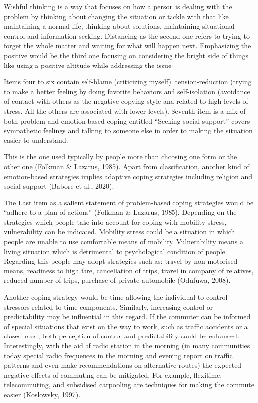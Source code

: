 \documentclass[
11pt, %
oneside, %
english, %
singlespacing, %
]{macthesis} %
\begin{document}
Wishful thinking is a way that focuses on how a person is dealing with the problem by thinking about changing the situation or tackle with that like maintaining a normal life, thinking about solutions, maintaining situational control and information seeking. Distancing as the second one refers to trying to forget the whole matter and waiting for what will happen next. Emphasizing the positive would be the third one focusing on considering the bright side of things like using a positive altitude while addressing the issue.

Items four to six contain self-blame (criticizing myself), tension-reduction (trying to make a better feeling by doing favorite behaviors and self-isolation (avoidance of contact with others as the negative copying style and related to high levels of stress. All the others are associated with lower levels). Seventh item is a mix of both problem and emotion-based coping entitled ``Seeking social support'' covers sympathetic feelings and talking to someone else in order to making the situation easier to understand.

This is the one used typically by people more than choosing one form or the other one (Folkman \& Lazarus, 1985). Apart from classification, another kind of emotion-based strategies implies adaptive coping strategies including religion and social support (Babore et al., 2020).

The Last item as a salient statement of problem-based coping strategies would be ``adhere to a plan of actions'' (Folkman \& Lazarus, 1985). Depending on the strategies which people take into account for coping with mobility stress, vulnerability can be indicated. Mobility stress could be a situation in which people are unable to use comfortable means of mobility. Vulnerability means a living situation which is detrimental to psychological condition of people. Regarding this people may adopt strategies such as: travel by non-motorised means, readiness to high fare, cancellation of trips, travel in company of relatives, reduced number of trips, purchase of private automobile (Odufuwa, 2008).

Another coping strategy would be time allowing the individual to control stressors related to time components. Similarly, increasing control or predictability may be influential in this regard. If the commuter can be informed of special situations that exist on the way to work, such as traffic accidents or a closed road, both perception of control and predictability could be enhanced. Interestingly, with the aid of radio station in the morning (in many communities today special radio frequences in the morning and evening report on traffic patterns and even make recommendations on alternative routes) the expected negative effects of commuting can be mitigated. For example, flexitime, telecommuting, and subsidised carpooling are techniques for making the commute easier (Koslowsky, 1997).
\end{document}
